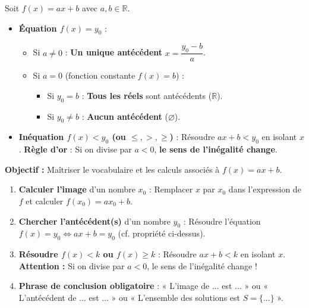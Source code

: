 \documentclass[11pt]{article}
\begin{document}
\begin{propriete}[Résolution de $f(x) = y_0$ et $f(x) < y_0$]
    Soit $f(x) = ax+b$ avec $a, b \in \mathbb{R}$.
    \begin{itemize}
        \item \textbf{Équation $f(x) = y_0$} :
        \begin{itemize}
            \item Si $a \neq 0$ : \textbf{Un unique antécédent} $x = \dfrac{y_0 - b}{a}$.
            \item Si $a = 0$ (fonction constante $f(x)=b$) :
            \begin{itemize}
                \item Si $y_0 = b$ : \textbf{Tous les réels} sont antécédents ($\mathbb{R}$).
                \item Si $y_0 \neq b$ : \textbf{Aucun antécédent} ($\varnothing$).
            \end{itemize}
        \end{itemize}
        \item \textbf{Inéquation $f(x) < y_0$ (ou $\le, >, \ge$)} : Résoudre $ax+b < y_0$ en isolant $x$.
        \textbf{Règle d'or} : Si on divise par $a < 0$, \textbf{le sens de l'inégalité change}.
    \end{itemize}
\end{propriete}

\begin{methode}
    \textbf{Objectif :} Maîtriser le vocabulaire et les calculs associés à $f(x)=ax+b$.
    \begin{enumerate}
        \item \textbf{Calculer l'image} d'un nombre $x_0$ : Remplacer $x$ par $x_0$ dans l'expression de $f$ et calculer $f(x_0)=ax_0+b$.
        \item \textbf{Chercher l'antécédent(s)} d'un nombre $y_0$ : Résoudre l'équation $f(x)=y_0 \Leftrightarrow ax+b=y_0$ (cf. propriété ci-dessus).
        \item \textbf{Résoudre $f(x) < k$ ou $f(x) \ge k$} : Résoudre $ax+b < k$ en isolant $x$. \textbf{Attention :} Si on divise par $a<0$, le sens de l'inégalité change !
        \item \textbf{Phrase de conclusion obligatoire} : « L'image de ... est ... » ou « L'antécédent de ... est ... » ou « L'ensemble des solutions est $S = \{...\}$ ».
    \end{enumerate}
\end{methode}
\end{document}
